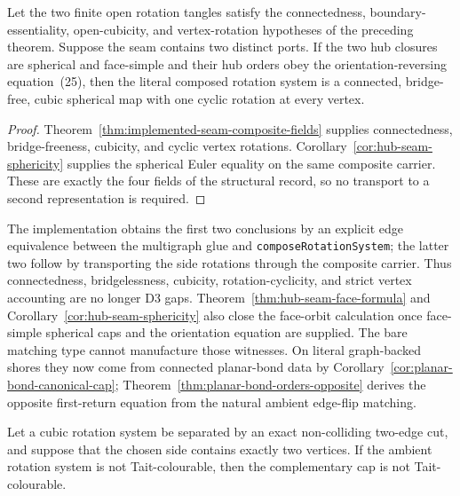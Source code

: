 \begin{corollary}
\label{cor:implemented-seam-composite-structure}
Let the two finite open rotation tangles satisfy the connectedness,
boundary-essentiality, open-cubicity, and vertex-rotation hypotheses of the
preceding theorem.  Suppose the seam contains two distinct ports.  If the
two hub closures are spherical and face-simple and their hub orders obey
the orientation-reversing equation~(25), then the literal composed rotation
system is a connected, bridge-free, cubic spherical map with one cyclic
rotation at every vertex.
\end{corollary}

\begin{proof}
Theorem~\ref{thm:implemented-seam-composite-fields} supplies connectedness,
bridge-freeness, cubicity, and cyclic vertex rotations.  Corollary~\ref{cor:hub-seam-sphericity}
supplies the spherical Euler equality on the same composite carrier.  These
are exactly the four fields of the structural record, so no transport to a
second representation is required.
\end{proof}

The implementation obtains the first two conclusions by an explicit edge
equivalence between the multigraph glue and
\texttt{composeRotationSystem}; the latter two follow by transporting the
side rotations through the composite carrier.  Thus connectedness,
bridgelessness, cubicity, rotation-cyclicity, and strict vertex accounting
are no longer D3 gaps.  Theorem~\ref{thm:hub-seam-face-formula} and
Corollary~\ref{cor:hub-seam-sphericity} also close the face-orbit calculation
once face-simple spherical caps and the orientation equation are supplied.
The bare matching type cannot manufacture those witnesses.  On literal
graph-backed shores they now come from connected planar-bond data by
Corollary~\ref{cor:planar-bond-canonical-cap};
Theorem~\ref{thm:planar-bond-orders-opposite} derives the opposite
first-return equation from the natural ambient edge-flip matching.

\begin{lemma}
\label{lem:digon-suppression-colour}
Let a cubic rotation system be separated by an exact non-colliding two-edge
cut, and suppose that the chosen side contains exactly two vertices.  If the
ambient rotation system is not Tait-colourable, then the complementary cap
is not Tait-colourable.
\end{lemma}


